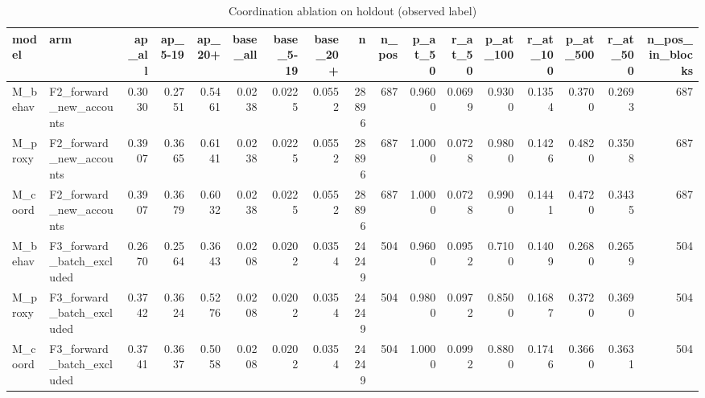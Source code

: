 \begin{table}
\caption{Coordination ablation on holdout (observed label)}
\label{tab:tab_coord_ablation_final}
\begin{tabular}{llrrrrrrrrrrrrrrr}
\toprule
model & arm & ap\_all & ap\_5-19 & ap\_20+ & base\_all & base\_5-19 & base\_20+ & n & n\_pos & p\_at\_50 & r\_at\_50 & p\_at\_100 & r\_at\_100 & p\_at\_500 & r\_at\_500 & n\_pos\_in\_blocks \\
\midrule
M\_behav & F2\_forward\_new\_accounts & 0.3030 & 0.2751 & 0.5461 & 0.0238 & 0.0225 & 0.0552 & 28896 & 687 & 0.9600 & 0.0699 & 0.9300 & 0.1354 & 0.3700 & 0.2693 & 687 \\
M\_proxy & F2\_forward\_new\_accounts & 0.3907 & 0.3665 & 0.6141 & 0.0238 & 0.0225 & 0.0552 & 28896 & 687 & 1.0000 & 0.0728 & 0.9800 & 0.1426 & 0.4820 & 0.3508 & 687 \\
M\_coord & F2\_forward\_new\_accounts & 0.3907 & 0.3679 & 0.6032 & 0.0238 & 0.0225 & 0.0552 & 28896 & 687 & 1.0000 & 0.0728 & 0.9900 & 0.1441 & 0.4720 & 0.3435 & 687 \\
M\_behav & F3\_forward\_batch\_excluded & 0.2670 & 0.2564 & 0.3643 & 0.0208 & 0.0202 & 0.0354 & 24249 & 504 & 0.9600 & 0.0952 & 0.7100 & 0.1409 & 0.2680 & 0.2659 & 504 \\
M\_proxy & F3\_forward\_batch\_excluded & 0.3742 & 0.3624 & 0.5276 & 0.0208 & 0.0202 & 0.0354 & 24249 & 504 & 0.9800 & 0.0972 & 0.8500 & 0.1687 & 0.3720 & 0.3690 & 504 \\
M\_coord & F3\_forward\_batch\_excluded & 0.3741 & 0.3637 & 0.5058 & 0.0208 & 0.0202 & 0.0354 & 24249 & 504 & 1.0000 & 0.0992 & 0.8800 & 0.1746 & 0.3660 & 0.3631 & 504 \\
\bottomrule
\end{tabular}
\end{table}
